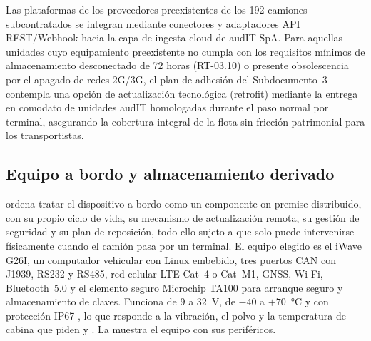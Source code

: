 Las plataformas de los proveedores preexistentes de los 192 camiones subcontratados se integran mediante conectores y adaptadores API REST/Webhook hacia la capa de ingesta cloud de audIT SpA. Para aquellas unidades cuyo equipamiento preexistente no cumpla con los requisitos mínimos de almacenamiento desconectado de 72 horas (RT-03.10) o presente obsolescencia por el apagado de redes 2G/3G, el plan de adhesión del Subdocumento~3 contempla una opción de actualización tecnológica (retrofit) mediante la entrega en comodato de unidades audIT homologadas durante el paso normal por terminal, asegurando la cobertura integral de la flota sin fricción patrimonial para los transportistas.

\subsection{Equipo a bordo y almacenamiento derivado}\label{sec:4-bordo}

 ordena tratar el dispositivo a bordo como un componente on-premise distribuido,
con su propio ciclo de vida, su mecanismo de actualización remota, su gestión de seguridad y su plan
de reposición, todo ello sujeto a que solo puede intervenirse físicamente cuando el camión pasa por un
terminal. El equipo elegido es el iWave G26I, un computador vehicular con Linux embebido, tres puertos
CAN con J1939, RS232 y RS485, red celular LTE Cat~4 o Cat~M1, GNSS, Wi-Fi, Bluetooth~5.0 y el elemento
seguro Microchip TA100 para arranque seguro y almacenamiento de claves. Funciona de 9 a 32~V, de
$-40$ a $+70$~°C y con protección IP67 \parencite{iwave_g26i}, lo que responde a la vibración, el polvo
y la temperatura de cabina que piden  y . La
 muestra el equipo con sus periféricos.


